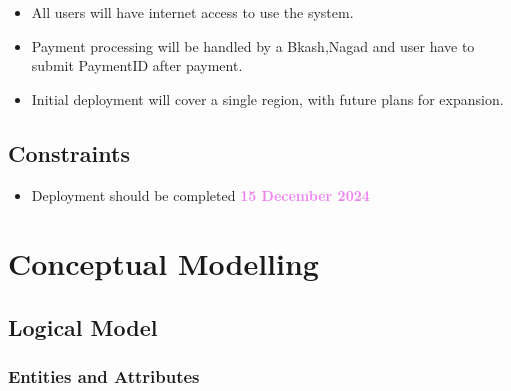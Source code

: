 \documentclass[a4paper,12pt]{article}  %
\renewcommand{\textbf}[1]{\textcolor{violet}{\bfseries #1}}
\begin{document}
\begin{itemize}
    \item All users will have internet access to use the system.
    \item Payment processing will be handled by a Bkash,Nagad and user have to submit PaymentID after payment.
    \item Initial deployment will cover a single region, with future plans for expansion.
\end{itemize}

\subsection{Constraints}

\begin{itemize}
    \item Deployment should be completed \textbf{15 December 2024}
\end{itemize}




\newpage

    \section{Conceptual Modelling}


\subsection{Logical Model}
\subsubsection{Entities and Attributes}
\end{document}
